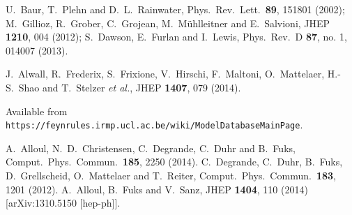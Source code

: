   U.~Baur, T.~Plehn and D.~L.~Rainwater,
  Phys.\ Rev.\ Lett.\  {\bf 89}, 151801 (2002); 
  M.~Gillioz, R.~Grober, C.~Grojean, M.~M\"uhlleitner and E.~Salvioni,
  JHEP {\bf 1210}, 004 (2012);
  S.~Dawson, E.~Furlan and I.~Lewis,
  Phys.\ Rev.\ D {\bf 87}, no. 1, 014007 (2013).
  
  J.~Alwall, R.~Frederix, S.~Frixione, V.~Hirschi, F.~Maltoni, O.~Mattelaer, H.-S.~Shao and T.~Stelzer {\it et al.},
  JHEP {\bf 1407}, 079 (2014).

 Available from \texttt{https://feynrules.irmp.ucl.ac.be/wiki/ModelDatabaseMainPage}.

  A.~Alloul, N.~D.~Christensen, C.~Degrande, C.~Duhr and B.~Fuks,
  Comput.\ Phys.\ Commun.\  {\bf 185}, 2250 (2014).
  C.~Degrande, C.~Duhr, B.~Fuks, D.~Grellscheid, O.~Mattelaer and T.~Reiter,
  Comput.\ Phys.\ Commun.\  {\bf 183}, 1201 (2012).
  A.~Alloul, B.~Fuks and V.~Sanz,
  JHEP {\bf 1404}, 110 (2014)
  [arXiv:1310.5150 [hep-ph]].
 
